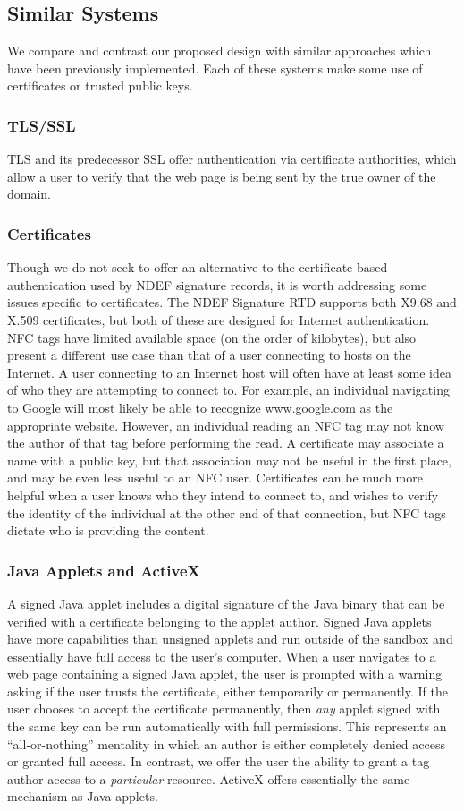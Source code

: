 \documentclass[12pt]{article}
\begin{document}
\subsection{Similar Systems}
We compare and contrast our proposed design with similar approaches which have been previously implemented.
Each of these systems make some use of certificates or trusted public keys.

\subsubsection{TLS/SSL}
TLS and its predecessor SSL offer authentication via certificate authorities, which allow a user to verify that the web page is being sent by the true owner of the domain.
\subsubsection{Certificates}
Though we do not seek to offer an alternative to the certificate-based authentication used by NDEF signature records, it is worth addressing some issues specific to certificates.
The NDEF Signature RTD supports both X9.68 and X.509 certificates, but both of these are designed for Internet authentication.
NFC tags have limited available space (on the order of kilobytes), but also present a different use case than that of a user connecting to hosts on the Internet.
A user connecting to an Internet host will often have at least some idea of who they are attempting to connect to.
For example, an individual navigating to Google will most likely be able to recognize \url{www.google.com} as the appropriate website.
However, an individual reading an NFC tag may not know the author of that tag before performing the read.
A certificate may associate a name with a public key, but that association may not be useful in the first place\cite{ellison2000}, and may be even less useful to an NFC user.
Certificates can be much more helpful when a user knows who they intend to connect to, and wishes to verify the identity of the individual at the other end of that connection, but NFC tags dictate who is providing the content.

\subsubsection{Java Applets and ActiveX}
A signed Java applet includes a digital signature of the Java binary that can be verified with a certificate belonging to the applet author.
Signed Java applets have more capabilities than unsigned applets and run outside of the sandbox and essentially have full access to the user's computer.
When a user navigates to a web page containing a signed Java applet, the user is prompted with a warning asking if the user trusts the certificate, either temporarily or permanently.
If the user chooses to accept the certificate permanently, then \textit{any} applet signed with the same key can be run automatically with full permissions.
This represents an ``all-or-nothing'' mentality in which an author is either completely denied access or granted full access.
In contrast, we offer the user the ability to grant a tag author access to a \textit{particular} resource.
ActiveX offers essentially the same mechanism as Java applets.
\end{document}
